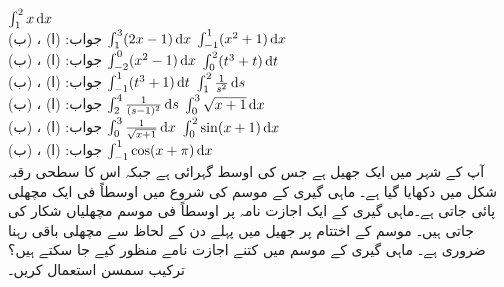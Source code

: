 $\int_1^2x\dif x$\\
جواب:\quad
(ا) ، (ب) 
$\int_1^3(2x-1)\dif x$
$\int_{-1}^1(x^2+1)\dif x$\\
جواب:\quad
(ا) ، (ب) 
$\int_{-2}^0(x^2-1)\dif x$
$\int_0^2(t^3+t)\dif t$\\
جواب:\quad
(ا) ، (ب) 
$\int_{-1}^1(t^3+1)\dif t$
$\int_1^2\tfrac{1}{s^2}\dif s$\\
جواب:\quad
(ا) ، (ب) 
$\int_2^4\tfrac{1}{(s-1)^2}\dif s$
$\int_0^3\sqrt{x+1}\dif x$\\
جواب:\quad
(ا) ، (ب) 
$\int_0^3\tfrac{1}{\sqrt{x+1}}\dif x$
$\int_0^2\sin(x+1)\dif x$\\
جواب:\quad
(ا) ، (ب) 
$\int_{-1}^1\cos(x+\pi)\dif x$
\\
آپ کے شہر میں ایک جھیل ہے جس کی اوسط گہرائی  ہے جبکہ اس کا سطحی رقبہ شکل  میں دکھایا گیا ہے۔ ماہی گیری کے موسم کی شروع میں اوسطاً فی  ایک مچھلی پائی جاتی ہے۔ماہی گیری کے ایک اجازت نامہ پر اوسطاً فی موسم  مچھلیاں شکار کی جاتی ہیں۔ موسم کے اختتام پر جھیل میں پہلے دن کے لحاظ سے  مچھلی باقی رہنا ضروری ہے۔  ماہی گیری کے موسم میں کتنے اجازت  نامے منظور کیے جا سکتے ہیں؟ ترکیب سمسن استعمال کریں۔  
